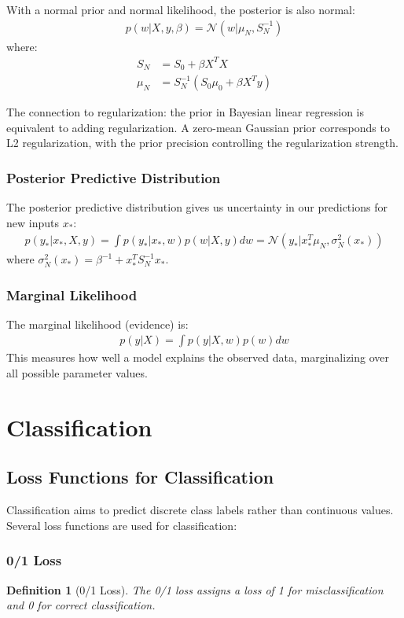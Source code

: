 \documentclass{article}
\newtheorem{definition}{Definition}
\begin{document}
With a normal prior and normal likelihood, the posterior is also normal:
\begin{align}
p(w|X, y, \beta) = \mathcal{N}(w|\mu_N, S_N^{-1})
\end{align}
where:
\begin{align}
S_N &= S_0 + \beta X^TX\\
\mu_N &= S_N^{-1}(S_0\mu_0 + \beta X^Ty)
\end{align}

The connection to regularization: the prior in Bayesian linear regression is equivalent to adding regularization. A zero-mean Gaussian prior corresponds to L2 regularization, with the prior precision controlling the regularization strength.

\subsubsection{Posterior Predictive Distribution}
The posterior predictive distribution gives us uncertainty in our predictions for new inputs $x_*$:
\begin{align}
p(y_*|x_*, X, y) = \int p(y_*|x_*, w)p(w|X, y)dw = \mathcal{N}(y_*|x_*^T\mu_N, \sigma_N^2(x_*))
\end{align}
where $\sigma_N^2(x_*) = \beta^{-1} + x_*^TS_N^{-1}x_*$.

\subsubsection{Marginal Likelihood}
The marginal likelihood (evidence) is:
\begin{align}
p(y|X) = \int p(y|X,w)p(w)dw
\end{align}
This measures how well a model explains the observed data, marginalizing over all possible parameter values.

\section{Classification}

\subsection{Loss Functions for Classification}
Classification aims to predict discrete class labels rather than continuous values. Several loss functions are used for classification:

\subsubsection{0/1 Loss}
\begin{definition}[0/1 Loss]
The 0/1 loss assigns a loss of 1 for misclassification and 0 for correct classification.
\end{definition}
\end{document}
